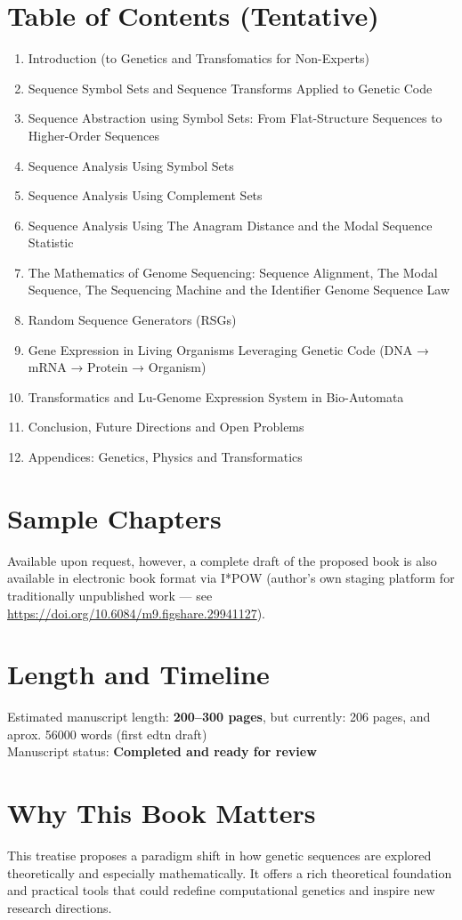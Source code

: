 \documentclass[12pt]{article}
\begin{document}
\section{Table of Contents (Tentative)}
\begin{enumerate}
    \item Introduction (to Genetics and Transfomatics for Non-Experts)
    \item Sequence Symbol Sets and Sequence Transforms Applied to Genetic Code
    \item Sequence Abstraction using Symbol Sets: From Flat-Structure Sequences to Higher-Order
Sequences
    \item Sequence Analysis Using Symbol Sets
    \item Sequence Analysis Using Complement Sets
    \item Sequence Analysis Using The Anagram Distance and the Modal Sequence Statistic
    \item The Mathematics of Genome Sequencing: Sequence Alignment, The Modal Sequence, The
Sequencing Machine and the Identifier Genome Sequence Law
    \item Random Sequence Generators (RSGs)
    \item Gene Expression in Living Organisms Leveraging Genetic Code (DNA → mRNA → Protein →
Organism)
    \item Transformatics and Lu-Genome Expression System in Bio-Automata
    \item Conclusion, Future Directions and Open Problems
    \item Appendices: Genetics, Physics and Transformatics
\end{enumerate}

\section{Sample Chapters}
Available upon request, however, a complete draft of the proposed book is also available in electronic book format via I*POW (author's own staging platform for traditionally unpublished work --- see \url{https://doi.org/10.6084/m9.figshare.29941127}). 

\section{Length and Timeline}
Estimated manuscript length: \textbf{200–300 pages}, but currently: 206 pages, and aprox. 56000 words (first edtn draft)\\
Manuscript status: \textbf{Completed and ready for review}

\section{Why This Book Matters}
This treatise proposes a paradigm shift in how genetic sequences are explored theoretically and especially mathematically. It offers a rich theoretical foundation and practical tools that could redefine computational genetics and inspire new research directions.
\end{document}
